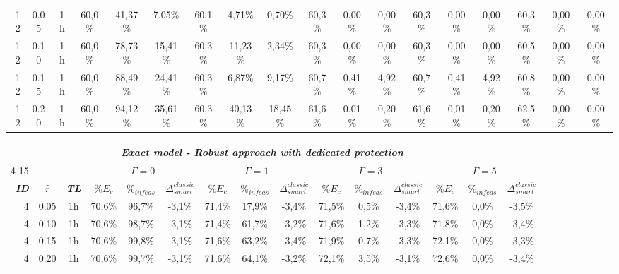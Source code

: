 \documentclass[final,5p,times,twocolumn]{elsarticle}
\begin{document}
\begin{table*}[!htb]
\begin{tabular}{rccccccccccccccccc}
12 & 0.05 & 1h & 60,0\% & 41,37\% &  7,05\% & 60,1\% & 4,71\% &  0,70\% & 60,3\% & 0,00\% & 0,00\% & 60,3\% & 0,00\% & 0,00\% & 60,3\% & 0,00\% & 0,00\% \\ 
12 & 0.10 & 1h & 60,0\% & 78,73\% & 15,41\% & 60,3\% & 11,23\% &  2,34\% & 60,3\% & 0,00\% & 0,00\% & 60,3\% & 0,00\% & 0,00\% & 60,5\% & 0,00\% & 0,00\%\\ 
12 & 0.15 & 1h & 60,0\% & 88,49\% & 24,41\% & 60,3\% & 6,87\% &  9,17\% & 60,7\% & 0,41\% & 4,92\% & 60,7\% & 0,41\% & 4,92\% & 60,8\% & 0,00\% & 0,00\% \\ 
12 & 0.20 & 1h & 60,0\% & 94,12\% & 35,61\% & 60,3\% & 40,13\% & 18,45\% & 61,6\% & 0,01\% & 0,20\% & 61,6\% & 0,01\% & 0,20\% & 62,5\% & 0,00\% & 0,00\%\\ 
\end{tabular}
\caption{Robustness analysis  for the solutions obtained by the robust exact model with no protection  with 1h time limit on polska instances}
\label{tab:polska_model_robust}
\tabcolsep 6.3pt
\vspace{1cm}
\begin{tabular}{rcccccccccccccc}
& & \multicolumn{11}{c}{\textbf{\textit{Exact model - Robust approach with dedicated protection}}} \\
\cline{4-15}
& & & \multicolumn{3}{c}{\textbf{\textit{$\Gamma = 0$}}} & \multicolumn{3}{c}{\textbf{\textit{$\Gamma = 1$}}} & \multicolumn{3}{c}{\textbf{\textit{$\Gamma = 3$}}} & \multicolumn{3}{c}{\textbf{\textit{$\Gamma = 5$}}} \\ 
\hline
\textbf{\textit{ID}} & \textbf{\textit{$\hat{r}$}} & \textbf{\textit{TL}} & \textbf{\textit{$\%E_c$}} & $\%_{infeas}$ &	$\Delta_{smart}^{classic}$ & \textbf{\textit{$\%E_c$}} & $\%_{infeas}$ & $\Delta_{smart}^{classic}$ & \textbf{\textit{$\%E_c$}} & $\%_{infeas}$ & $\Delta_{smart}^{classic}$ & \textbf{\textit{$\%E_c$}} & $\%_{infeas}$ & $\Delta_{smart}^{classic}$ \\ 
\hline
4 & 0.05 & 1h &  70,6\% & 96,7\% & -3,1\% & 71,4\% & 17,9\% & -3,4\% & 71,5\% & 0,5\% & -3,4\% & 71,6\% & 0,0\% & -3,5\%  \\ 
4 & 0.10 & 1h &  70,6\% & 98,7\% & -3,1\% & 71,4\% & 61,7\% & -3,2\% & 71,6\% & 1,2\% & -3,3\% & 71,8\% & 0,0\% & -3,4\%  \\ 
4 & 0.15 & 1h &  70,6\% & 99,8\% & -3,1\% & 71,6\% & 63,2\% & -3,4\% & 71,9\% & 0,7\% & -3,3\% & 72,1\% & 0,0\% & -3,3\%  \\ 
4 & 0.20 & 1h &  70,6\% & 99,7\% & -3,1\% & 71,6\% & 64,1\% & -3,2\% & 72,1\% & 3,5\% & -3,1\% & 72,6\% & 0,0\% & -3,4\%  \\ 

\end{tabular}
\end{table*}
\end{document}
